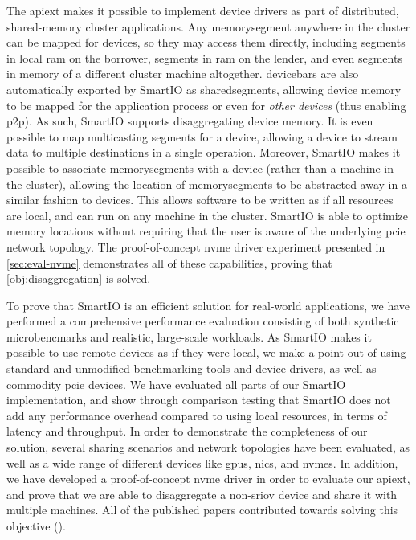 The \gls{apiext} makes it possible to implement device drivers as part of distributed, shared-memory cluster applications. 
%
Any \gls{memorysegment} anywhere in the cluster can be mapped for devices, so they may access them directly, including \glspl{segment} in local \gls{ram} on the \gls{borrower}, \glspl{segment} in \gls{ram} on the \gls{lender}, and even \glspl{segment} in memory of a different cluster machine altogether.
%
\Glspl{devicebar} are also automatically exported by SmartIO as \glspl{sharedsegment}, allowing device memory to be mapped for the application process or even for \emph{other devices} (thus enabling \gls{p2p}).
%
As such, SmartIO supports \gls{disaggregating} device memory.
%
It is even possible to map \gls{multicasting} \glspl{segment} for a device, allowing a device to stream data to multiple destinations in a single operation.
%
Moreover, SmartIO makes it possible to associate \glspl{memorysegment} with a device (rather than a machine in the cluster), allowing the location of \glspl{memorysegment} to be abstracted away in a similar fashion to devices.
%
This allows software to be written as if all resources are local, and can run on any machine in the cluster.
%
%
SmartIO is able to optimize memory locations without requiring that the user is aware of the underlying \gls{pcie} network topology.
%
The proof-of-concept \gls{nvme} driver experiment presented in \cref{sec:eval-nvme} demonstrates all of these capabilities, proving that \cref*{obj:disaggregation} is solved.



\objexperiments*%
%
To prove that SmartIO is an efficient solution for real-world applications, we have performed a comprehensive performance evaluation consisting of both synthetic microbencmarks and realistic, large-scale workloads.
%
As SmartIO makes it possible to use remote devices as if they were local, we make a point out of using standard and unmodified benchmarking tools and device drivers, as well as commodity \gls{pcie} devices.
%
We have evaluated all parts of our SmartIO implementation, and show through comparison testing that SmartIO does not add any performance overhead compared to using local resources, in terms of latency and throughput.
%
In order to demonstrate the completeness of our solution, several sharing scenarios and network topologies have been evaluated, as well as a wide range of different devices like \glspl{gpu}, \glspl{nic}, and \glspl{nvme}.
%
In addition, we have developed a proof-of-concept \gls{nvme} driver in order to evaluate our \gls{apiext}, and prove that we are able to \gls{disaggregate} a non-\gls{sriov} device and share it with multiple machines. 
%
All of the published papers contributed towards solving this objective ().




